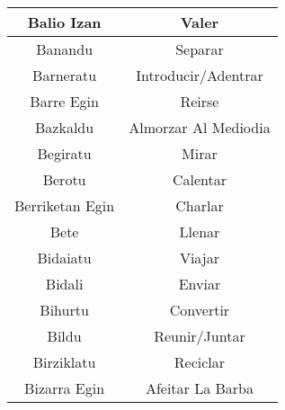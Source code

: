 \documentclass[11pt, a4paper]{article}
\begin{document}
\begin{table}[h]
\begin{tabular}{cc}
		                       Balio Izan                        &                             Valer                              \\ \hline
		                        Banandu                          &                            Separar                             \\ \hline
		                       Barneratu                         &                      Introducir/Adentrar                       \\ \hline
		                       Barre Egin                        &                             Reirse                             \\ \hline
		                        Bazkaldu                         &                      Almorzar Al Mediodia                      \\ \hline
		                        Begiratu                         &                             Mirar                              \\ \hline
		                         Berotu                          &                            Calentar                            \\ \hline
		                    Berriketan Egin                      &                            Charlar                             \\ \hline
		                          Bete                           &                             Llenar                             \\ \hline
		                        Bidaiatu                         &                             Viajar                             \\ \hline
		                         Bidali                          &                             Enviar                             \\ \hline
		                        Bihurtu                          &                           Convertir                            \\ \hline
		                         Bildu                           &                         Reunir/Juntar                          \\ \hline
		                       Birziklatu                        &                            Reciclar                            \\ \hline
		                      Bizarra Egin                       &                        Afeitar La Barba                        \\ \hline

\end{tabular}
\end{table}
\end{document}
